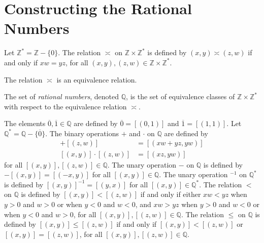 \section{Constructing the Rational Numbers}
\label{rat}

\begin{definition} %
	Let $\mathbb{Z}^{*} = \mathbb{Z} - \{0\}$. The relation $\asymp$ on $\mathbb{Z} \times \mathbb{Z}^{*}$ is defined by $(x, y) \asymp (z, w)$ if and only if $x w = y z$, for all $(x, y), (z, w) \in \mathbb{Z} \times \mathbb{Z}^{*}$.
\end{definition}

\begin{lemma} %
	\label{rat:l:equiv}
	The relation $\asymp$ is an equivalence relation.
\end{lemma}

\begin{definition} %
	The set of \emph{rational numbers}, denoted $\mathbb{Q}$, is the set of equivalence classes of $\mathbb{Z} \times \mathbb{Z}^{*}$ with respect to the equivalence relation $\asymp$.

	The elements $\overline{0}, \overline{1} \in \mathbb{Q}$ are defined by $\overline{0} = [(0, 1)]$ and $\overline{1} = [(1, 1)] .$ Let $\mathbb{Q}^{*} = \mathbb{Q} - \{\overline{0}\}$. The binary operations $+$ and $\cdot$ on $\mathbb{Q}$ are defined by
	\begin{align*}
		[(x, y)] + [(z, w)]     & = [(x w + y z, y w)] \\
		[(x, y)] \cdot [(z, w)] & = [(x z, y w)]
	\end{align*}
	for all $[(x, y)], [(z, w)] \in \mathbb{Q}$. The unary operation $-$ on $\mathbb{Q}$ is defined by $-[(x, y)] = [(-x, y)]$ for all $[(x, y)] \in \mathbb{Q}$. The unary operation $^{-1}$ on $\mathbb{Q}^{*}$ is defined by $[(x, y)]^{-1} = [(y, x)]$ for all $[(x, y)] \in \mathbb{Q}^{*}$. The relation $<$ on $\mathbb{Q}$ is defined by $[(x, y)] < [(z, w)]$ if and only if either $x w < y z$ when $y>0$ and $w > 0$ or when $y < 0$ and $w < 0$, and $x w > y z$ when $y > 0$ and $w < 0$ or when $y < 0$ and $w > 0$, for all $[(x, y)], [(z, w)] \in \mathbb{Q}$. The relation $\leq$ on $\mathbb{Q}$ is defined by $[(x, y)] \leq [(z, w)]$ if and only if $[(x, y)] < [(z, w)]$ or $[(x, y)] = [(z, w)]$, for all $[(x, y)], [(z, w)] \in \mathbb{Q}$.
\end{definition}

